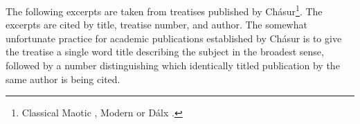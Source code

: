 \documentclass[a4paper]{article}
\begin{document}
The following excerpts are taken from treatises published by Chásur\footnote{Classical Maotic , Modern  or Dálx .}. The excerpts are cited by title, treatise number, and author. The somewhat unfortunate practice for academic publications established by Chásur is to give the treatise a single word title describing the subject in the broadest sense, followed by a number distinguishing which identically titled publication by the same author is being cited.
\end{document}
